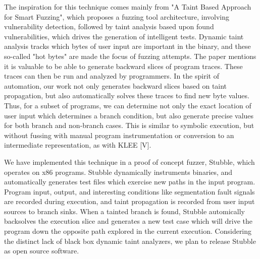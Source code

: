 \documentclass[11pt,expanded,copyright]{fsuthesis}
\begin{document}
The inspiration for this technique comes mainly from "A Taint Based Approach for Smart Fuzzing", which proposes a fuzzing tool architecture, involving vulnerability detection, followed by taint analysis based upon found vulnerabilities, which drives the generation of intelligent tests. Dynamic taint analysis tracks which bytes of user input are important in the binary, and these so-called "hot bytes" are made the focus of fuzzing attempts. The paper mentions it is valuable to be able to generate backward slices of program traces. These traces can then be run and analyzed by programmers. In the spirit of automation, our work not only generates backward slices based on taint propagation, but also automatically solves these traces to find new byte values. Thus, for a subset of programs, we can determine not only the exact location of user input which determines a branch condition, but also generate precise values for both branch and non-branch cases. This is similar to symbolic execution, but without fussing with manual program instrumentation or conversion to an intermediate representation, as with KLEE [V].

We have implemented this technique in a proof of concept fuzzer, Stubble, which operates on x86 programs. Stubble dynamically instruments binaries, and automatically generates test files which exercise new paths in the input program. Program input, output, and interesting conditions like segmentation fault signals are recorded during execution, and taint propagation is recorded from user input sources to branch sinks. When a tainted branch is found, Stubble automically backsolves the execution slice and generates a new test case which will drive the program down the opposite path explored in the current execution. Considering the distinct lack of black box dynamic taint analyzers, we plan to release Stubble as open source software.
\end{document}
